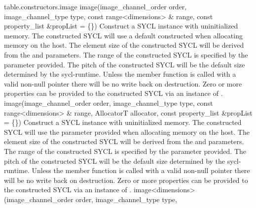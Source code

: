 {table.constructors.image}
    \addRowFourSL
       { image(image_channel_order order, }
       { image_channel_type type, }
       { const range<dimensions> \& range, }
       { const property_list \&propList = \{\}) }
       {
         Construct a SYCL  instance with uninitialized memory.       
         The constructed SYCL  will use a default constructed  when allocating memory on the host.
         The element size of the constructed SYCL  will be derived from the  and  parameters.
         The range of the constructed SYCL  is specified by the  parameter provided.
         The pitch of the constructed SYCL  will be the default size determined by the \gls{sycl-runtime}.
         Unless the member function  is called with a valid non-null pointer there will be no write back on destruction.
         Zero or more properties can be provided to the constructed SYCL  via an instance of .
       }
    \addRowFiveSL
       { image(image_channel_order order, }
       { image_channel_type type, }
       { const range<dimensions> \& range, }
       { AllocatorT allocator, }
       { const property_list \&propList = \{\}) }
       {
         Construct a SYCL  instance with uninitialized memory.       
         The constructed SYCL  will use the  parameter provided when allocating memory on the host.
         The element size of the constructed SYCL  will be derived from the  and  parameters.
         The range of the constructed SYCL  is specified by the  parameter provided.
         The pitch of the constructed SYCL  will be the default size determined by the \gls{sycl-runtime}.
         Unless the member function  is called with a valid non-null pointer there will be no write back on destruction.
         Zero or more properties can be provided to the constructed SYCL  via an instance of .
       }       
     \addRowFiveSL
       {image<dimensions>(image_channel_order order, }
       { image_channel_type type, }
